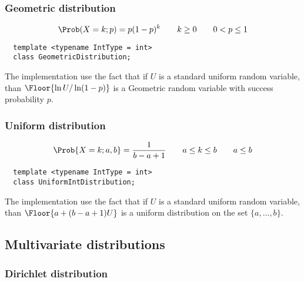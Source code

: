 \subsubsection{Geometric distribution}

\begin{equation*}
  \Prob(X = k;p) = p(1-p)^k
  \qquad k \ge 0
  \qquad 0 < p \le 1
\end{equation*}
\begin{Verbatim}
  template <typename IntType = int>
  class GeometricDistribution;
\end{Verbatim}
The implementation use the fact that if $U$ is a standard uniform random
variable, than $\Floor{\ln U / \ln(1-p)}$ is a Geometric random variable with
success probability $p$.

\subsubsection{Uniform distribution}

\begin{equation*}
  \Prob{X = k;a,b} = \frac{1}{b - a + 1}
  \qquad a \le k \le b
  \qquad a \le b
\end{equation*}
\begin{Verbatim}
  template <typename IntType = int>
  class UniformIntDistribution;
\end{Verbatim}
The implementation use the fact that if $U$ is a standard uniform random
variable, than $\Floor{a + (b - a + 1) U}$ is a uniform distribution on the set
$\{a,\dots,b\}$.

\subsection{Multivariate distributions}
\label{sub:Multivariate distributions}

\subsubsection{Dirichlet distribution}

